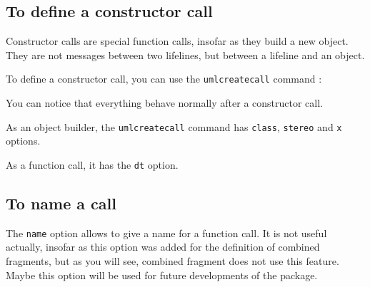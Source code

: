 \documentclass[a4paper,11pt]{report}
\newcommand{\inputTikZ}[1]{%
  }%
\newcommand{\inputTikZ}[1]{%
    \texttt{[image: fig/\#1.pdf]}%
  }%
\begin{document}
\medskip

\begin{minipage}{0.5\textwidth}

\end{minipage}
\begin{minipage}{0.5\textwidth}
\begin{center}
\inputTikZ{callreturn}
\end{center}
\end{minipage}

\medskip

\subsection{To define a constructor call}\label{ss.create}

Constructor calls are special function calls, insofar as they build a new object. They are not messages between two lifelines, but between a lifeline and an object.

To define a constructor call, you can use the {\tt umlcreatecall} command :

\medskip

\begin{minipage}{0.5\textwidth}

\end{minipage}
\begin{minipage}{0.5\textwidth}
\begin{center}
\inputTikZ{createcall}
\end{center}
\end{minipage}

\medskip

You can notice that everything behave normally after a constructor call.

\medskip

As an object builder, the {\tt umlcreatecall} command has {\tt class}, {\tt stereo} and {\tt x} options.

As a function call, it has the {\tt dt} option.

\subsection{To name a call}\label{ss.callname}

The {\tt name} option allows to give a name for a function call. It is not useful actually, insofar as this option was added for the definition of combined fragments, but as you will see, combined fragment does not use this feature. Maybe this option will be used for future developments of the package.
\end{document}
